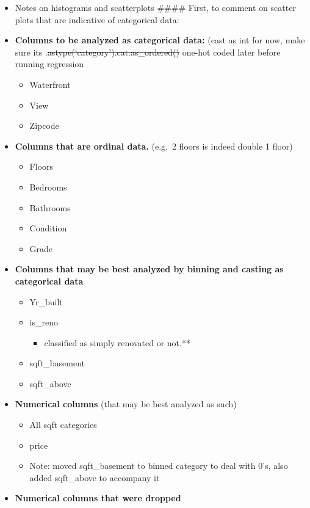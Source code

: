 \documentclass[11pt]{article}
\providecommand{\tightlist}{%
      \setlength{\itemsep}{0pt}\setlength{\parskip}{0pt}}
\begin{document}
\begin{itemize}
\tightlist
\item
  Notes on histograms and scatterplots \#\#\#\# First, to comment on
  scatter plots that are indicative of categorical data:
\item
  \textbf{Columns to be analyzed as categorical data:} (cast as int for
  now, make sure its .\sout{astype(`category').cat.as\_ordered()}
  one-hot coded later before running regression

  \begin{itemize}
  \tightlist
  \item
    Waterfront
  \item
    View
  \item
    Zipcode
  \end{itemize}
\item
  \textbf{Columns that are ordinal data.} (e.g.~2 floors is indeed
  double 1 floor)

  \begin{itemize}
  \tightlist
  \item
    Floors
  \item
    Bedrooms
  \item
    Bathrooms
  \item
    Condition
  \item
    Grade
  \end{itemize}
\item
  \textbf{Columns that may be best analyzed by binning and casting as
  categorical data}

  \begin{itemize}
  \tightlist
  \item
    Yr\_built
  \item
    is\_reno

    \begin{itemize}
    \tightlist
    \item
      classified as simply renovated or not.**
    \end{itemize}
  \item
    sqft\_basement
  \item
    sqft\_above
  \end{itemize}
\item
  \textbf{Numerical columns} (that may be best analyzed as such)

  \begin{itemize}
  \tightlist
  \item
    All sqft categories
  \item
    price
  \item
    Note: moved sqft\_basement to binned category to deal with 0's, also
    added sqft\_above to accompany it
  \end{itemize}
\item
  \textbf{Numerical columns that were dropped}


\end{itemize}
\end{document}
